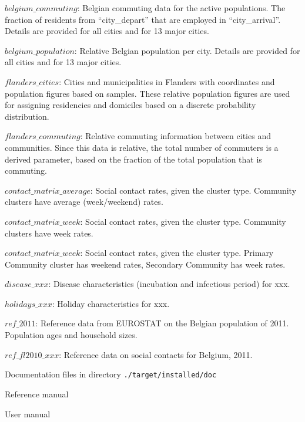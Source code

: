 \begin{compactitem}
\begin{compactitem}
        		\item $belgium\_commuting$: Belgian commuting data for the active populations. The fraction of residents from ``city\_depart'' that are employed in ``city\_arrival''. Details are provided for all cities and for 13 major cities.
			\item $belgium\_population$: Relative Belgian population per city. Details are provided for all cities and for 13 major cities.
        	\item $flanders\_cities$: Cities and municipalities in Flanders with coordinates and population figures based on samples. These relative population figures are used for assigning residencies and domiciles based on a discrete probability distribution.
        	\item $flanders\_commuting$: Relative commuting information between cities and communities. Since this data is relative, the total number of commuters is a derived parameter, based on the fraction of the total population that is commuting.
			\item $contact\_matrix\_average$: Social contact rates, given the cluster type. Community clusters have average (week/weekend) rates.
			\item $contact\_matrix\_week$: Social contact rates, given the cluster type. Community clusters have week rates.
			\item $contact\_matrix\_week$: Social contact rates, given the cluster type. Primary Community cluster has weekend rates, Secondary Community has week rates.
			\item $disease\_xxx$: Disease characteristics (incubation and infectious period) for xxx.
			\item $holidays\_xxx$: Holiday characteristics for xxx.
			\item $ref\_2011$: Reference data from EUROSTAT on the Belgian population of 2011. Population ages and household sizes.
			\item $ref\_fl2010\_xxx$: Reference data on social contacts for Belgium, 2011.
        \end{compactitem}
%
    \item Documentation files in directory \texttt{./target/installed/doc}
      	\begin{compactitem}
        			\item Reference manual
        			\item User manual
        \end{compactitem}
%
\end{compactitem}

